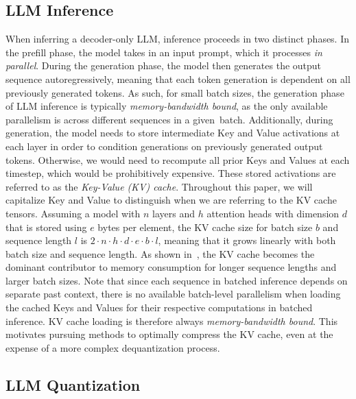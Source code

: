 \subsection{LLM Inference}

When inferring a decoder-only LLM, inference proceeds in two distinct phases. In the prefill phase, the model takes in an input prompt, which it processes \textit{in parallel}. During the generation phase, the model then generates the output sequence autoregressively, meaning that each token generation is dependent on all previously generated tokens. As such, for small batch sizes, the generation phase of LLM inference is typically \textit{memory-bandwidth bound}, as the only available parallelism is across different sequences in a given~batch. Additionally, during generation, the model needs to store intermediate Key and Value activations at each layer in order to condition generations on previously generated output tokens. Otherwise, we would need to recompute all prior Keys and Values at each timestep, which would be prohibitively expensive. These stored activations are referred to as the \emph{Key-Value (KV) cache}. Throughout this paper, we will capitalize Key and Value to distinguish when we are referring to the KV cache tensors. Assuming a model with $n$ layers and $h$ attention heads with dimension $d$ that is stored using $e$ bytes per element, the KV cache size for batch size $b$ and sequence length $l$ is $2\cdot n\cdot h\cdot d\cdot e\cdot b\cdot l$, meaning that it grows linearly with both batch size and sequence length. As shown in~, the KV cache becomes the dominant contributor to memory consumption for longer sequence lengths and larger batch sizes. Note that since each sequence in batched inference depends on separate past context, there is no available batch-level parallelism when loading the cached Keys and Values for their respective computations in batched inference. KV cache loading is therefore always \textit{memory-bandwidth bound}. This motivates pursuing methods to optimally compress the KV cache, even at the expense of a more complex dequantization process.

\subsection{LLM Quantization}

